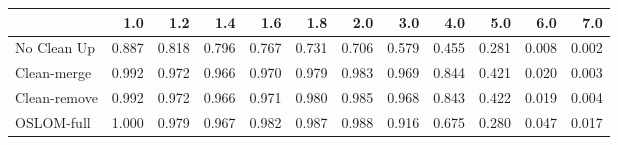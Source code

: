 \begin{tabular}{lrrrrrrrrrrr}
\toprule
{} &   1.0 &   1.2 &   1.4 &   1.6 &   1.8 &   2.0 &   3.0 &   4.0 &   5.0 &   6.0 &   7.0 \\
\midrule
No Clean Up  & 0.887 & 0.818 & 0.796 & 0.767 & 0.731 & 0.706 & 0.579 & 0.455 & 0.281 & 0.008 & 0.002 \\
Clean-merge  & 0.992 & 0.972 & 0.966 & 0.970 & 0.979 & 0.983 & 0.969 & 0.844 & 0.421 & 0.020 & 0.003 \\
Clean-remove & 0.992 & 0.972 & 0.966 & 0.971 & 0.980 & 0.985 & 0.968 & 0.843 & 0.422 & 0.019 & 0.004 \\
OSLOM-full   & 1.000 & 0.979 & 0.967 & 0.982 & 0.987 & 0.988 & 0.916 & 0.675 & 0.280 & 0.047 & 0.017 \\
\bottomrule
\end{tabular}
